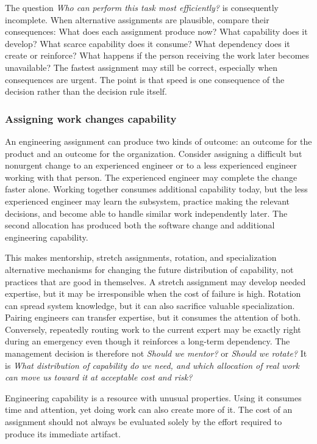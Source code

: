 The question \emph{Who can perform this task most efficiently?} is consequently incomplete. When
alternative assignments are plausible, compare their consequences: What does each assignment
produce now? What capability does it develop? What scarce capability does it consume? What
dependency does it create or reinforce? What happens if the person receiving the work later becomes
unavailable? The fastest assignment may still be correct, especially when consequences are urgent.
The point is that speed is one consequence of the decision rather than the decision rule itself.

\subsubsection{Assigning work changes capability}\label{sec-assigning-work-changes-capability}

An engineering assignment can produce two kinds of outcome: an outcome for the product and an
outcome for the organization. Consider assigning a difficult but nonurgent change to an experienced
engineer or to a less experienced engineer working with that person. The experienced engineer may
complete the change faster alone. Working together consumes additional capability today, but the
less experienced engineer may learn the subsystem, practice making the relevant decisions, and
become able to handle similar work independently later. The second allocation has produced both
the software change and additional engineering capability.

This makes mentorship, stretch assignments, rotation, and specialization alternative mechanisms
for changing the future distribution of capability, not practices that are good in themselves. A
stretch assignment may develop needed expertise, but it may be irresponsible when the cost of
failure is high. Rotation can spread system knowledge, but it can also sacrifice valuable
specialization. Pairing engineers can transfer expertise, but it consumes the attention of both.
Conversely, repeatedly routing work to the current expert may be exactly right during an emergency
even though it reinforces a long-term dependency. The management decision is therefore not \emph{Should
we mentor?} or \emph{Should we rotate?} It is \emph{What distribution of capability do we need, and which
allocation of real work can move us toward it at acceptable cost and risk?}

Engineering capability is a resource with unusual properties. Using it consumes time and attention,
yet doing work can also create more of it. The cost of an assignment should not always be evaluated
solely by the effort required to produce its immediate artifact.

